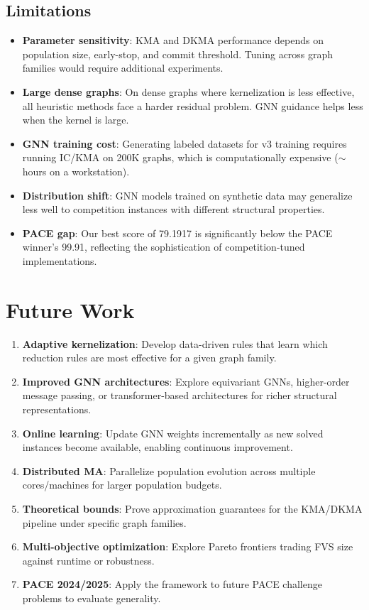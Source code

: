 \documentclass[10pt,a4paper]{report}
\theoremstyle{definition}
\begin{document}
\section{Limitations}

\begin{itemize}
	\item \textbf{Parameter sensitivity}: KMA and DKMA performance depends on population size, early-stop, and commit threshold. Tuning across graph families would require additional experiments.
	\item \textbf{Large dense graphs}: On dense graphs where kernelization is less effective, all heuristic methods face a harder residual problem. GNN guidance helps less when the kernel is large.
	\item \textbf{GNN training cost}: Generating labeled datasets for v3 training requires running IC/KMA on 200K graphs, which is computationally expensive ($\sim$hours on a workstation).
	\item \textbf{Distribution shift}: GNN models trained on synthetic data may generalize less well to competition instances with different structural properties.
	\item \textbf{PACE gap}: Our best score of 79.1917 is significantly below the PACE winner's 99.91, reflecting the sophistication of competition-tuned implementations.
\end{itemize}

\chapter{Future Work}
\label{ch:future}

\begin{enumerate}
	\item \textbf{Adaptive kernelization}: Develop data-driven rules that learn which reduction rules are most effective for a given graph family.
	\item \textbf{Improved GNN architectures}: Explore equivariant GNNs, higher-order message passing, or transformer-based architectures for richer structural representations.
	\item \textbf{Online learning}: Update GNN weights incrementally as new solved instances become available, enabling continuous improvement.
	\item \textbf{Distributed MA}: Parallelize population evolution across multiple cores/machines for larger population budgets.
	\item \textbf{Theoretical bounds}: Prove approximation guarantees for the KMA/DKMA pipeline under specific graph families.
	\item \textbf{Multi-objective optimization}: Explore Pareto frontiers trading FVS size against runtime or robustness.
	\item \textbf{PACE 2024/2025}: Apply the framework to future PACE challenge problems to evaluate generality.
\end{enumerate}
\end{document}
